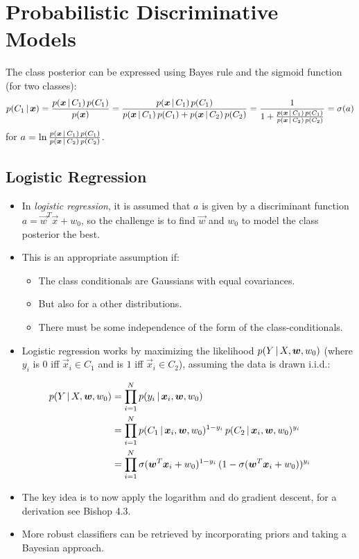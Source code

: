 	\section{Probabilistic Discriminative Models}
		The class posterior can be expressed using Bayes rule and the sigmoid function (for two classes):
		\begin{equation}
			p(C_1 \,\vert\, \bm{x}) = \frac{p(\bm{x} \,\vert\, C_1) \, p(C_1)}{p(\bm{x})} = \frac{p(\bm{x} \,\vert\, C_1) \, p(C_1)}{p(\bm{x} \,\vert\, C_1) \, p(C_1) + p(\bm{x} \,\vert\, C_2) \, p(C_2)} = \frac{1}{1 + \frac{p(\bm{x} \,\vert\, C_1) \, p(C_1)}{p(\bm{x} \,\vert\, C_2) \, p(C_2)}} = \sigma(a)
		\end{equation}
		for \( a = \ln \frac{p(\bm{x} \,\vert\, C_1) \, p(C_1)}{p(\bm{x} \,\vert\, C_2) \, p(C_2)} \).

		\subsection{Logistic Regression} %
			\begin{itemize}
				\item In \emph{logistic regression}, it is assumed that \( a \) is given by a discriminant function \( a = \vec{w}^T \vec{x} + w_0 \), so the challenge is to find \( \vec{w} \) and \( w_0 \) to model the class posterior the best.
				\item This is an appropriate assumption if:
					\begin{itemize}
						\item The class conditionals are Gaussians with equal covariances.
						\item But also for a other distributions.
						\item There must be some independence of the form of the class-conditionals.
					\end{itemize}
				\item Logistic regression works by maximizing the likelihood \( p(Y \,\vert\, X, \bm{w}, w_0) \) (where \( y_i \) is \(0\) iff \( \vec{x}_i \in C_1 \) and is \( 1 \) iff \( \vec{x}_i \in C_2 \)), assuming the data is drawn i.i.d.:
			\end{itemize}
			\begin{align} %
				p(Y \given X, \vec{w}, w_0) &= \prod_{i = 1}^{N} p(y_i \given \vec{x}_i, \vec{w}, w_0) \\
					&= \prod_{i = 1}^{N} p(C_1 \given \vec{x}_i, \vec{w}, w_0)^{1 - y_i} \, p(C_2 \given \vec{x}_i, \vec{w}, w_0)^{y_i} \\
					&= \prod_{i = 1}^{N} \sigma(\vec{w}^T \vec{x}_i + w_0)^{1 - y_i} \, (1 - \sigma(\vec{w}^T \vec{x}_i + w_0))^{y_i}
			\end{align}
			\begin{itemize}
				\item The key idea is to now apply the logarithm and do gradient descent, for a derivation see Bishop 4.3.
				\item More robust classifiers can be retrieved by incorporating priors and taking a Bayesian approach.
			\end{itemize}
	

